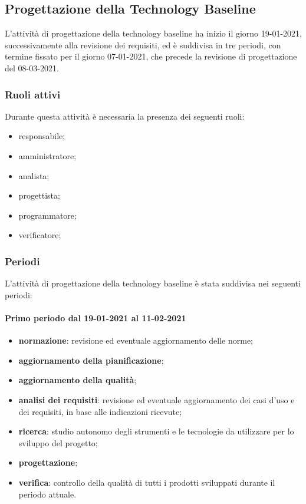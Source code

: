 	\newpage
	
	\subsection{Progettazione della Technology Baseline}
	L'attività di progettazione della technology baseline ha inizio il giorno 19-01-2021, successivamente
	alla revisione dei requisiti, ed è suddivisa in tre periodi, con termine fissato per il giorno 07-01-2021,
	che precede la revisione di progettazione del 08-03-2021.
	
	\subsubsection{Ruoli attivi}
	Durante questa attività è necessaria la presenza dei seguenti ruoli:
	\begin{itemize}
	\item responsabile;
	\item amministratore;
	\item analista;
	\item progettista;
	\item programmatore;
	\item verificatore;
	\end{itemize}

	\subsubsection{Periodi}
	L'attività di progettazione della technology baseline è stata suddivisa nei seguenti periodi:
	
	\paragraph{Primo periodo dal 19-01-2021 al 11-02-2021}
	\begin{itemize}
	\item \textbf{normazione}: revisione ed eventuale aggiornamento delle norme;
	\item \textbf{aggiornamento della pianificazione};
	\item \textbf{aggiornamento della qualità};
	\item \textbf{analisi dei requisiti}: revisione ed eventuale aggiornamento dei casi d’uso e dei requisiti, in base alle indicazioni ricevute;
	\item \textbf{ricerca}: studio autonomo degli strumenti e le tecnologie da utilizzare per lo sviluppo del
	progetto;
	\item \textbf{progettazione};
	\item \textbf{verifica}: controllo della qualità di tutti i prodotti sviluppati durante il periodo attuale.
	\end{itemize}

